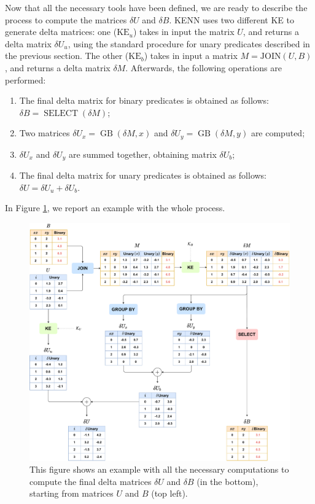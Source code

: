 Now that all the necessary tools have been defined, we are ready to describe the process to compute the matrices $\delta U$ and $\delta B$. KENN uses two different KE to generate delta matrices: one ($\text{KE}_u$) takes in input the matrix $U$, and returns a delta matrix $\delta U_u$, using the standard procedure for unary predicates described in the previous section. The other ($\text{KE}_b$) takes in input a matrix $M=\text{JOIN}(U,B)$, and returns a delta matrix $\delta M$. Afterwards, the following operations are performed:
\begin{enumerate}
	\item The final delta matrix for binary predicates is obtained as follows: $\delta B = \operatorname{SELECT}(\delta M)$;
	\item Two matrices $\delta U_x = \operatorname{GB}(\delta M, x)$ and $\delta U_y = \operatorname{GB}(\delta M, y)$ are computed;
	\item $\delta U_x$ and $\delta U_y$ are summed together, obtaining matrix $\delta U_b$;
	\item The final delta matrix for unary predicates is obtained as follows: $\delta U = \delta U_u + \delta U_b$.
\end{enumerate}
In Figure \ref{fig:kenn_rel_global_scheme}, we report an example with the whole process.


\begin{figure}
	\centering
	\includegraphics[width=\linewidth]{figures/kenn_relational_global_chart.pdf}
	\caption{This figure shows an example with all the necessary computations to compute the final delta matrices $\delta U$ and $\delta B$ (in the bottom), starting from matrices $U$ and $B$ (top left).}
	\label{fig:kenn_rel_global_scheme}
\end{figure}
 

